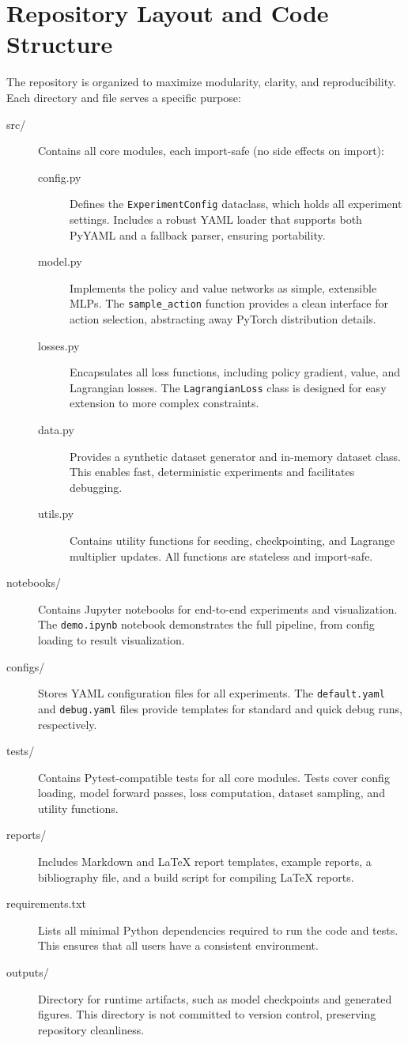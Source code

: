 \documentclass[11pt]{article}
\begin{document}
\section{Repository Layout and Code Structure}
The repository is organized to maximize modularity, clarity, and reproducibility. Each directory and file serves a specific purpose:
\begin{description}
  \item[src/] Contains all core modules, each import-safe (no side effects on import):
    \begin{description}
      \item[config.py] Defines the \texttt{ExperimentConfig} dataclass, which holds all experiment settings. Includes a robust YAML loader that supports both PyYAML and a fallback parser, ensuring portability.
      \item[model.py] Implements the policy and value networks as simple, extensible MLPs. The \texttt{sample\_action} function provides a clean interface for action selection, abstracting away PyTorch distribution details.
      \item[losses.py] Encapsulates all loss functions, including policy gradient, value, and Lagrangian losses. The \texttt{LagrangianLoss} class is designed for easy extension to more complex constraints.
      \item[data.py] Provides a synthetic dataset generator and in-memory dataset class. This enables fast, deterministic experiments and facilitates debugging.
      \item[utils.py] Contains utility functions for seeding, checkpointing, and Lagrange multiplier updates. All functions are stateless and import-safe.
    \end{description}
  \item[notebooks/] Contains Jupyter notebooks for end-to-end experiments and visualization. The \texttt{demo.ipynb} notebook demonstrates the full pipeline, from config loading to result visualization.
  \item[configs/] Stores YAML configuration files for all experiments. The \texttt{default.yaml} and \texttt{debug.yaml} files provide templates for standard and quick debug runs, respectively.
  \item[tests/] Contains Pytest-compatible tests for all core modules. Tests cover config loading, model forward passes, loss computation, dataset sampling, and utility functions.
  \item[reports/] Includes Markdown and LaTeX report templates, example reports, a bibliography file, and a build script for compiling LaTeX reports.
  \item[requirements.txt] Lists all minimal Python dependencies required to run the code and tests. This ensures that all users have a consistent environment.
  \item[outputs/] Directory for runtime artifacts, such as model checkpoints and generated figures. This directory is not committed to version control, preserving repository cleanliness.
\end{description}
\end{document}
